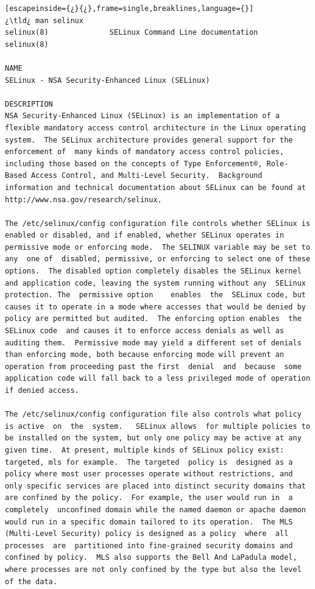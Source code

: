 \begin{lstlisting}[escapeinside={¿}{¿},frame=single,breaklines,language={}]
¿\tld¿ man selinux
selinux(8)				SELinux Command Line documentation				selinux(8)

NAME
SELinux - NSA Security-Enhanced Linux (SELinux)

DESCRIPTION
NSA Security-Enhanced Linux (SELinux) is an implementation of a flexible mandatory access control architecture in the Linux operating system.  The SELinux architecture provides general support for the  enforcement of  many kinds of mandatory access control policies, including those based on the concepts of Type Enforcement®, Role- Based Access Control, and Multi-Level Security.  Background information and technical documentation about SELinux can be found at http://www.nsa.gov/research/selinux.

The /etc/selinux/config configuration file controls whether SELinux is enabled or disabled, and if enabled, whether SELinux operates in permissive mode or enforcing mode.  The SELINUX variable may be set to any  one of  disabled, permissive, or enforcing to select one of these options.  The disabled option completely disables the SELinux kernel and application code, leaving the system running without any  SELinux  protection. The  permissive option	enables	 the  SELinux code, but causes it to operate in a mode where accesses that would be denied by policy are permitted but audited.  The enforcing option enables  the SELinux code  and causes it to enforce access denials as well as auditing them.  Permissive mode may yield a different set of denials than enforcing mode, both because enforcing mode will prevent an operation from proceeding past the first  denial  and  because  some application code will fall back to a less privileged mode of operation if denied access.

The /etc/selinux/config configuration file also controls what policy is	active	on  the	 system.   SELinux allows  for multiple policies to be installed on the system, but only one policy may be active at any given time.  At present, multiple kinds of SELinux policy exist: targeted, mls for example.  The targeted  policy is  designed as a policy where most user processes operate without restrictions, and only specific services are placed into distinct security domains that are confined by the policy.  For example, the user would run in  a  completely  unconfined domain while the named daemon or apache daemon would run in a specific domain tailored to its operation.  The MLS (Multi-Level Security) policy is designed as a policy  where	 all  processes  are  partitioned into fine-grained security domains and confined by policy.  MLS also supports the Bell And LaPadula model, where processes are not only confined by the type but also the level of the data.


\end{lstlisting}
